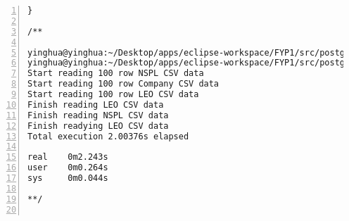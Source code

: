 \begin{lstlisting}[breaklines, frame=single, numbers=left, caption={Golang Concurrent Program Source Code}, label=commandline-02]
}

/**

yinghua@yinghua:~/Desktop/apps/eclipse-workspace/FYP1/src/postgres-process$ go build concurrent-read-csv.go
yinghua@yinghua:~/Desktop/apps/eclipse-workspace/FYP1/src/postgres-process$ time go run concurrent-read-csv.go
Start reading 100 row NSPL CSV data
Start reading 100 row Company CSV data
Start reading 100 row LEO CSV data
Finish reading LEO CSV data
Finish reading NSPL CSV data
Finish readying LEO CSV data
Total execution 2.00376s elapsed

real	0m2.243s
user	0m0.264s
sys		0m0.044s

**/


\end{lstlisting}

